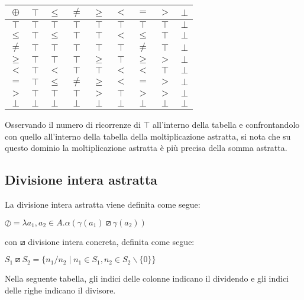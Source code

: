\documentclass[a4paper, 12pt, oneside,fleqn]{book}
\begin{document}
\begin{center}
	\begin{tabular}{| c | c | c | c | c | c | c | c | c | }
		\hline
		$\oplus$ & $\top$ & $\leq$ & $\neq$ & $\geq$ & $<$ & $=$ & $>$ & $\bot$ \\
		\hline
		$\top$ & $\top$ & $\top$ & $\top$ & $\top$ & $\top$ & $\top$ & $\top$ & $\bot$ \\
		\hline
		$\leq$ & $\top$ & $\leq$ & $\top$ & $\top$ & $<$ & $\leq$ & $\top$ & $\bot$\\
		\hline
		$\neq$ & $\top$ & $\top$ & $\top$ & $\top$ & $\top$ & $\neq$ & $\top$ & $\bot$ \\
		\hline
		$\geq$ & $\top$ & $\top$ & $\top$ & $\geq$ & $\top$ & $\geq$ & $>$ & $\bot$\\
		\hline
		$<$ & $\top$ & $<$ & $\top$ & $\top$ & $<$ & $<$ & $\top$ & $\bot$\\
		\hline
		$=$ & $\top$ & $\leq$ & $\neq$ & $\geq$ & $<$ & $=$ & $>$ & $\bot$\\
		\hline
		$>$ & $\top$ & $\top$ & $\top$ & $>$ & $\top$ & $>$ & $>$ & $\bot$ \\
		\hline
		$\bot$ & $\bot$ & $\bot$ & $\bot$ & $\bot$ & $\bot$ & $\bot$ & $\bot$ & $\bot$ \\
		\hline
	\end{tabular}
\end{center}

Osservando il numero di ricorrenze di $\top$ all'interno della tabella e confrontandolo con quello all'interno della tabella della moltiplicazione astratta, si nota che su questo dominio la moltiplicazione astratta è più precisa della somma astratta.

\subsection{Divisione intera astratta}

La divisione intera astratta viene definita come segue:

\begin{center}
	$ \oslash = \lambda a_1,a_2 \in A . \alpha(\gamma(a_1) \boxslash \gamma(a_2)) $
\end{center}

con $\boxslash$ divisione intera concreta, definita come segue:

\begin{center}
	$ S_1 \boxslash S_2 = \{ n_1 / n_2 \mid n_1 \in S_1, n_2 \in S_2 \backslash \{0\} \} $
\end{center}
Nella seguente tabella, gli indici delle colonne indicano il dividendo e gli indici delle righe indicano il divisore.
\end{document}
